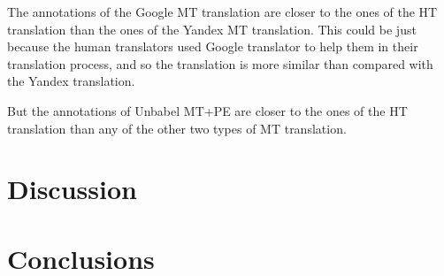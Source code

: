 \begin{table}[ht]
\centering
{}
\caption{Macro-Evaluation of how close the annotations of MT and MT+PE translation are to the annotations of HT}
\label{table:results_comparasion_translations_macro}
\end{table}

The annotations of the Google MT translation are closer to the ones of the HT translation than the ones of the Yandex MT translation. This could be just because the human translators used Google translator to help them in their translation process, and so the translation is more similar than compared with the Yandex translation. 

But the annotations of Unbabel MT+PE are closer to the ones of the HT translation than any of the other two types of MT translation. 


\section{Discussion}





\section{Conclusions}




  
